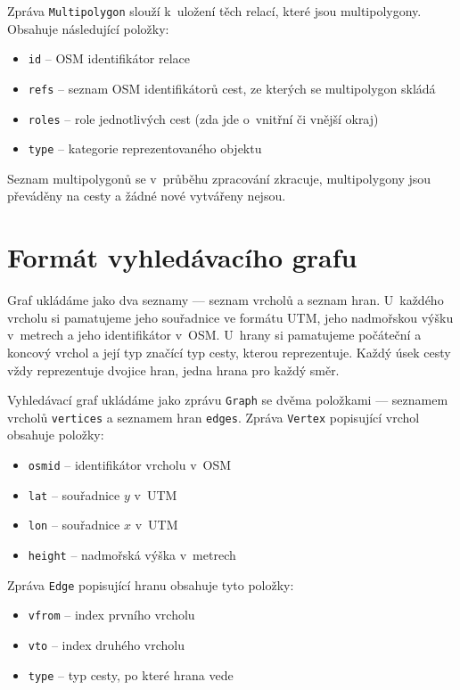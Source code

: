 Zpráva \verb|Multipolygon| slouží k~uložení těch relací, které jsou
multipolygony. Obsahuje následující položky:
\begin{itemize}
	\item \verb|id| -- OSM identifikátor relace
	\item \verb|refs| -- seznam OSM identifikátorů cest, ze kterých se
	multipolygon skládá
	\item \verb|roles| -- role jednotlivých cest (zda jde o~vnitřní či vnější
	okraj)
	\item \verb|type| -- kategorie reprezentovaného objektu
\end{itemize}
Seznam multipolygonů se v~průběhu zpracování zkracuje, multipolygony jsou
převáděny na cesty a žádné nové vytvářeny nejsou.



\section{Formát vyhledávacího grafu}
Graf ukládáme jako dva seznamy --- seznam vrcholů a seznam hran. U~každého
vrcholu si pamatujeme jeho souřadnice ve formátu UTM, jeho nadmořskou výšku
v~metrech a jeho identifikátor v~OSM. U~hrany si pamatujeme počáteční a koncový
vrchol a její typ značící typ cesty, kterou reprezentuje. Každý úsek cesty vždy
reprezentuje dvojice hran, jedna hrana pro každý směr.

Vyhledávací graf ukládáme jako zprávu \verb|Graph| se dvěma položkami ---
seznamem vrcholů \verb|vertices| a seznamem hran \verb|edges|. Zpráva
\verb|Vertex| popisující vrchol obsahuje položky:
\begin{itemize}
	\item \verb|osmid| -- identifikátor vrcholu v~OSM
	\item \verb|lat| -- souřadnice $y$ v~UTM
	\item \verb|lon| -- souřadnice $x$ v~UTM
	\item \verb|height| -- nadmořská výška v~metrech
\end{itemize}
Zpráva \verb|Edge| popisující hranu obsahuje tyto položky:
\begin{itemize}
	\item \verb|vfrom| -- index prvního vrcholu
	\item \verb|vto| -- index druhého vrcholu
	\item \verb|type| -- typ cesty, po které hrana vede
\end{itemize}

